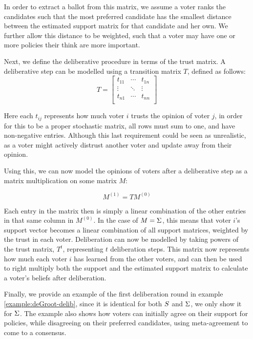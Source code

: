 In order to extract a ballot from this matrix, we assume a voter ranks the
candidates such that the most preferred candidate has the smallest distance
between the estimated support matrix for that candidate and her own. We
further allow this distance to be weighted, such that a voter may have one or
more policies their think are more important.

Next, we define the deliberative procedure in terms of the trust matrix. A
deliberative step can be modelled using a transition matrix $T$, defined as
follows: 
\[ T=\begin{bmatrix} t_{11} & \cdots & t_{1n} \\ \vdots & \ddots &
\vdots          \\ t_{n1} & \cdots  & t_{nn} \\\end{bmatrix} \]

Here each $t_{ij}$ represents how much voter $i$ trusts the opinion of voter
$j$, in order for this to be a proper stochastic matrix, all rows must sum to
one, and have non-negative entries. Although this last requirement could be
seen as unrealistic, as a voter might actively distrust another voter and
update away from their opinion.

Using this, we can now model the opinions of voters after a deliberative step
as a matrix multiplication on some matrix $M$:

\begin{equation} M^{(1)} = TM^{(0)} \label{eq:update_degroot} \end{equation}

Each entry in the matrix then is simply a linear combination of the other
entries in that same column in $M^{(0)}$. In the case of $M = \Sigma$,
this means that voter $i$'s support vector becomes a linear combination of all
support matrices, weighted by the trust in each voter. Deliberation can now be
modelled by taking powers of the trust matrix, $T^{t}$, representing $t$
deliberation steps. This matrix now represents how much each voter $i$ has
learned from the other voters, and can then be used to right multiply both the
support and the estimated support matrix to calculate a voter's beliefs after
deliberation.

Finally, we provide an example of the first deliberation round in example
\ref{example:deGroot-delib}, since it is identical for both $S$ and
$\Sigma$, we only show it for $\Sigma$. The example also shows how
voters can initially agree on their support for policies, while disagreeing on
their preferred candidates, using meta-agreement to come to a consensus.

